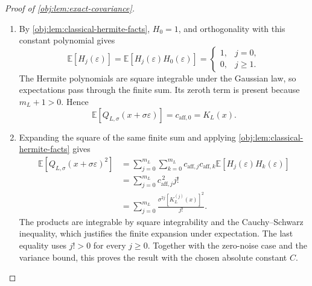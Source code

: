 \documentclass[11pt]{article}
\begin{document}
\begin{proof}[Proof of \cref{obj:lem:exact-covariance}]
\begin{enumerate}
When \(j=i+2k\), this coefficient equals
\[
(-1)^k\binom ji(2k-1)!!
=
\frac{(-1/2)^k}{k!}\frac{j!}{i!}.
\]
This is exactly the coefficient of \(z^i\) in
\(\mathcal T_{j,1}(z^j)\). For \(i>j\), or for \(j-i\) odd, both coefficients are zero. Thus
\[
\mathcal T_{m_L,1}(z^j)=H_j(z)
\qquad(0\le j\le m_L).
\]

Finally, finite Taylor expansion followed by scaling gives
\[
K_L(x+\sigma z)
=
\sum_{j=0}^{m_L}
\frac{\sigma^jK_L^{(j)}(x)}{j!}\,z^j,
\qquad
c_{\mathrm{aff},j}
=
\frac{\sigma^jK_L^{(j)}(x)}{j!}.
\]
Substituting these coefficients and the transformed monomials into the preceding decomposition proves the finite identity
\[
Q_{L,\sigma}(x+\sigma z)
=
\sum_{j=0}^{m_L}
\frac{\sigma^jK_L^{(j)}(x)}{j!}\,H_j(z)
\qquad(z\in\mathbb R).
\]

\item By \cref{obj:lem:classical-hermite-facts}, \(H_0=1\), and orthogonality with this constant polynomial gives
\[
\mathbb E[H_j(\varepsilon)]
=
\mathbb E[H_j(\varepsilon)H_0(\varepsilon)]
=
\begin{cases}
1,&j=0,\\
0,&j\ge1.
\end{cases}
\]
The Hermite polynomials are square integrable under the Gaussian law, so expectations pass through the finite sum. Its zeroth term is present because \(m_L+1>0\). Hence
\[
\mathbb E[Q_{L,\sigma}(x+\sigma\varepsilon)]
=
c_{\mathrm{aff},0}
=
K_L(x).
\]

\item Expanding the square of the same finite sum and applying \cref{obj:lem:classical-hermite-facts} gives
\[
\begin{aligned}
\mathbb E[Q_{L,\sigma}(x+\sigma\varepsilon)^2]
&=
\sum_{j=0}^{m_L}\sum_{k=0}^{m_L}
c_{\mathrm{aff},j}c_{\mathrm{aff},k}
\mathbb E[H_j(\varepsilon)H_k(\varepsilon)]\\
&=
\sum_{j=0}^{m_L}c_{\mathrm{aff},j}^{\,2}j!\\
&=
\sum_{j=0}^{m_L}
\frac{\sigma^{2j}[K_L^{(j)}(x)]^2}{j!}.
\end{aligned}
\]
The products are integrable by square integrability and the Cauchy--Schwarz inequality, which justifies the finite expansion under expectation. The last equality uses \(j!>0\) for every \(j\ge0\). Together with the zero-noise case and the variance bound, this proves the result with the chosen absolute constant \(C\).
\end{enumerate}
\end{proof}
\end{document}
